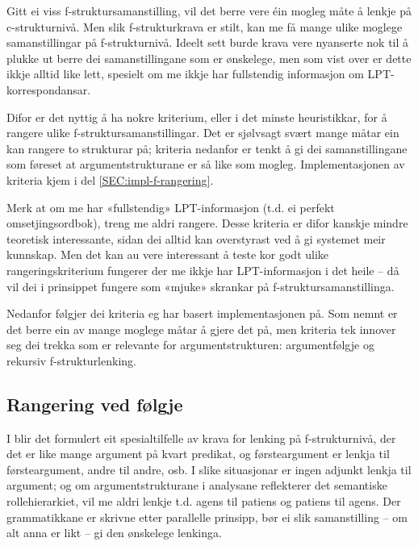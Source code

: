 \documentclass[12pt,a4paper,oneside,draft]{report}
\begin{document}
   \label{SEC:rangering}

Gitt ei viss f\hyp{}struktursamanstilling, vil det berre vere éin mogleg
måte å lenkje på c\hyp{}strukturnivå. Men slik f\hyp{}strukturkrava er stilt,
kan me få mange ulike moglege samanstillingar på
f\hyp{}strukturnivå. Ideelt sett burde krava vere nyanserte nok til å
plukke ut berre dei samanstillingane som er ønskelege, men som vist
over er dette ikkje alltid like lett, spesielt om me ikkje har
fullstendig informasjon om LPT\hyp{}korrespondansar.

Difor er det nyttig å ha nokre kriterium, eller i det minste
heuristikkar, for å rangere ulike f\hyp{}struktursamanstillingar. Det er
sjølvsagt svært mange måtar ein kan rangere to strukturar på; kriteria
nedanfor er tenkt å gi dei samanstillingane som føreset at
argumentstrukturane er så like som mogleg. Implementasjonen av
kriteria kjem i del \ref{SEC:impl-f-rangering}.

Merk at om me har «fullstendig» LPT\hyp{}informasjon (t.d. ei perfekt
omsetjingsordbok), treng me aldri rangere. Desse kriteria er difor
kanskje mindre teoretisk interessante, sidan dei alltid kan
overstyrast ved å gi systemet meir kunnskap. Men det kan au vere
interessant å teste kor godt ulike rangeringskriterium fungerer der me
ikkje har LPT\hyp{}informasjon i det heile -- då vil dei i prinsippet
fungere som «mjuke» skrankar på f\hyp{}struktursamanstillinga.

Nedanfor følgjer dei kriteria eg har basert implementasjonen på. Som
nemnt er det berre ein av mange moglege måtar å gjere det på, men
kriteria tek innover seg dei trekka som er relevante for
argumentstrukturen: argumentfølgje og rekursiv f\hyp{}strukturlenking.

\subsection{Rangering ved følgje}
\label{sec-3.8.1}

I \citet[s.~75--76]{dyvik2009lmp} blir det formulert eit
 spesialtilfelle av krava for lenking på f\hyp{}strukturnivå, der det
 er like mange argument på kvart predikat, og førsteargument er lenkja
 til førsteargument, andre til andre, osb. I slike situasjonar er
 ingen adjunkt lenkja til argument; og om argumentstrukturane i
 analysane reflekterer det semantiske rollehierarkiet, vil me aldri
 lenkje t.d. agens til patiens og patiens til agens. Der grammatikkane
 er skrivne etter parallelle prinsipp, bør ei slik samanstilling -- om
 alt anna er likt -- gi den ønskelege lenkinga.
\end{document}

